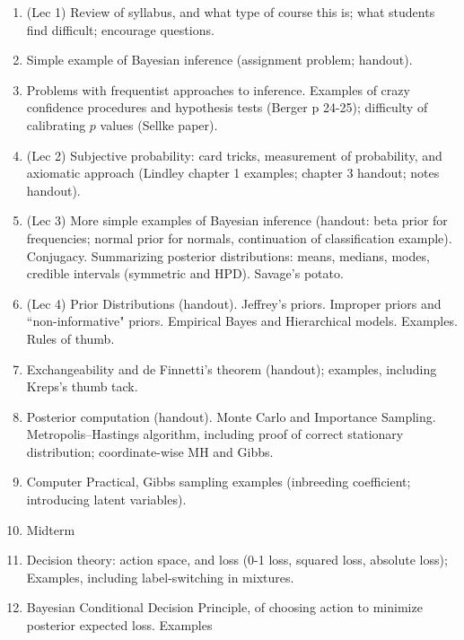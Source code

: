 \begin{enumerate}
\item (Lec 1) Review of syllabus, and what type of course this is; what students find difficult; encourage questions. 
\item Simple example of Bayesian inference (assignment problem; handout). 
\item Problems with frequentist approaches to inference. Examples of crazy confidence procedures and hypothesis tests (Berger p 24-25); difficulty of calibrating $p$ values (Sellke paper). 
\item (Lec 2) Subjective probability: card tricks, 
measurement of probability, and axiomatic approach (Lindley chapter 1 examples; chapter 3 handout; notes handout).
\item (Lec 3) More simple examples of Bayesian inference (handout: beta prior for frequencies; normal prior for normals, continuation of classification example).
Conjugacy. Summarizing posterior distributions: means, medians, modes, credible intervals (symmetric and HPD). Savage's potato.
\item (Lec 4) Prior Distributions (handout). Jeffrey's priors. Improper priors and ``non-informative" priors. 
Empirical Bayes and Hierarchical models. Examples. Rules of thumb.
\item Exchangeability and de Finnetti's theorem (handout); examples, including Kreps's thumb tack. %
\item Posterior computation (handout). Monte Carlo and Importance Sampling. Metropolis--Hastings algorithm, including proof of correct stationary distribution; coordinate-wise MH and Gibbs. 
\item Computer Practical, Gibbs sampling examples (inbreeding coefficient; introducing latent variables).  %
\item Midterm
\item Decision theory: action space, and loss (0-1 loss, squared loss, absolute loss); Examples, including label-switching in mixtures.
\item Bayesian Conditional Decision Principle, of choosing action to minimize posterior expected loss. Examples

\end{enumerate}
